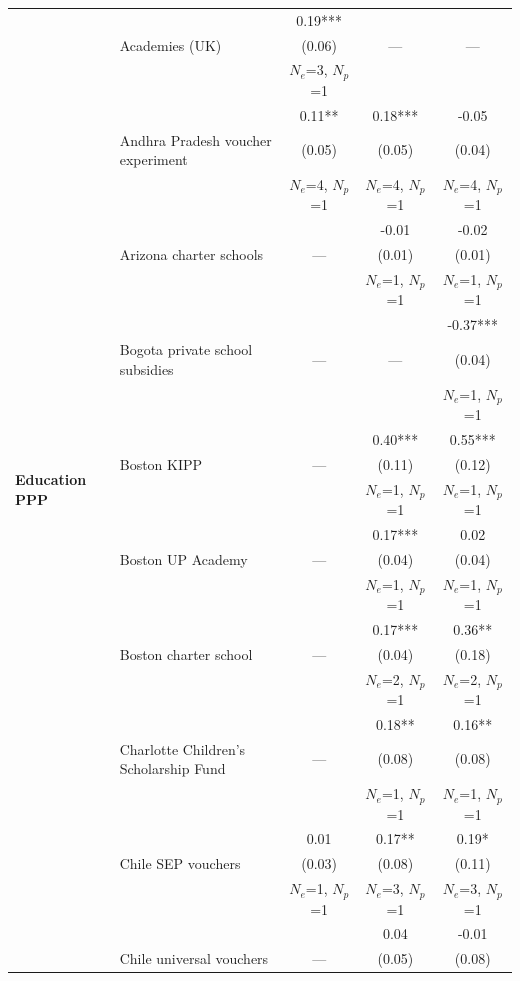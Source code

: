 \begin{longtable}{@{\extracolsep{\fill}} l l c c c @{}}
\multirow{144}{*}{\textbf{Education PPP}}
  &  & 0.19*** &  &  \\
  & Academies (UK) & (0.06) & --- & --- \\
  &  & $N_e$=3, $N_p$=1 &  &  \\
\cmidrule(lr){2-5}
  &  & 0.11** & 0.18*** & -0.05 \\
  & Andhra Pradesh voucher experiment & (0.05) & (0.05) & (0.04) \\
  &  & $N_e$=4, $N_p$=1 & $N_e$=4, $N_p$=1 & $N_e$=4, $N_p$=1 \\
\cmidrule(lr){2-5}
  &  &  & -0.01 & -0.02 \\
  & Arizona charter schools & --- & (0.01) & (0.01) \\
  &  &  & $N_e$=1, $N_p$=1 & $N_e$=1, $N_p$=1 \\
\cmidrule(lr){2-5}
  &  &  &  & -0.37*** \\
  & Bogota private school subsidies & --- & --- & (0.04) \\
  &  &  &  & $N_e$=1, $N_p$=1 \\
\cmidrule(lr){2-5}
  &  &  & 0.40*** & 0.55*** \\
  & Boston KIPP & --- & (0.11) & (0.12) \\
  &  &  & $N_e$=1, $N_p$=1 & $N_e$=1, $N_p$=1 \\
\cmidrule(lr){2-5}
  &  &  & 0.17*** & 0.02 \\
  & Boston UP Academy & --- & (0.04) & (0.04) \\
  &  &  & $N_e$=1, $N_p$=1 & $N_e$=1, $N_p$=1 \\
\cmidrule(lr){2-5}
  &  &  & 0.17*** & 0.36** \\
  & Boston charter school & --- & (0.04) & (0.18) \\
  &  &  & $N_e$=2, $N_p$=1 & $N_e$=2, $N_p$=1 \\
\cmidrule(lr){2-5}
  &  &  & 0.18** & 0.16** \\
  & Charlotte Children's Scholarship Fund & --- & (0.08) & (0.08) \\
  &  &  & $N_e$=1, $N_p$=1 & $N_e$=1, $N_p$=1 \\
\cmidrule(lr){2-5}
  &  & 0.01 & 0.17** & 0.19* \\
  & Chile SEP vouchers & (0.03) & (0.08) & (0.11) \\
  &  & $N_e$=1, $N_p$=1 & $N_e$=3, $N_p$=1 & $N_e$=3, $N_p$=1 \\
\cmidrule(lr){2-5}
  &  &  & 0.04 & -0.01 \\
  & Chile universal vouchers & --- & (0.05) & (0.08) \\

\end{longtable}
